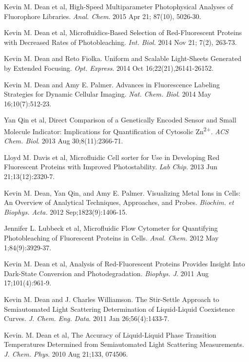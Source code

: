 \begin{etaremune}
\item Kevin M. Dean et al,  High-Speed Multiparameter Photophysical Analyses  of Fluorophore Libraries. {\it Anal. Chem}.  2015 Apr 21; 87(10), 5026-30.

\item Kevin M. Dean et al, Microfluidics-Based Selection of Red-Fluorescent Proteins with Decreased Rates of Photobleaching.  {\it Int. Biol.}  2014 Nov 21; 7(2), 263-73.

\item Kevin M. Dean and Reto Fiolka.  Uniform and Scalable Light-Sheets Generated by Extended Focusing.  {\it Opt. Express}.  2014  Oct 16;22(21),26141-26152.

\item Kevin M. Dean and Amy E. Palmer.  Advances in Fluorescence Labeling Strategies for Dynamic Cellular Imaging.   {\it Nat. Chem. Biol}. 2014 May 16;10(7):512-23. 

\item Yan Qin et al, Direct Comparison of a Genetically Encoded Sensor and Small Molecule Indicator: Implications for Quantification of Cytosolic Zn\textsuperscript{2+}. {\it ACS Chem. Biol}. 2013 Aug 30;8(11):2366-71.

\item Lloyd M. Davis et al, Microfluidic Cell sorter for Use in Developing Red Fluorescent Proteins with Improved Photostability. {\it Lab Chip}. 2013 Jun 21;13(12):2320-7.

\item Kevin M. Dean, Yan Qin, and Amy E. Palmer.  Visualizing Metal Ions in Cells:  An Overview of Analytical Techniques, Approaches, and Probes. {\it Biochim. et Biophys. Acta.}  2012  Sep;1823(9):1406-15.

\item Jennifer L. Lubbeck et al, Microfluidic Flow Cytometer for Quantifying Photobleaching of Fluorescent Proteins in Cells. {\it Anal. Chem.} 2012 May 1;84(9):3929-37.

\item Kevin M. Dean et al, Analysis of Red-Fluorescent Proteins Provides Insight Into Dark-State Conversion and Photodegradation.  {\it Biophys. J}. 2011 Aug 17;101(4):961-9.

\item Kevin M. Dean and J. Charles Williamson. The Stir-Settle Approach to Semiautomated Light Scattering Determination of Liquid-Liquid Coexistence Curves.  {\it J. Chem. Eng. Data}.  2011 Jan 26;56(4):1433-7. 

\item Kevin. M. Dean et al, The Accuracy of Liquid-Liquid Phase Transition Temperatures Determined from Semiautomated Light Scattering Measurements.  {\it J. Chem. Phys}. 2010 Aug 21;133, 074506.

\end{etaremune}